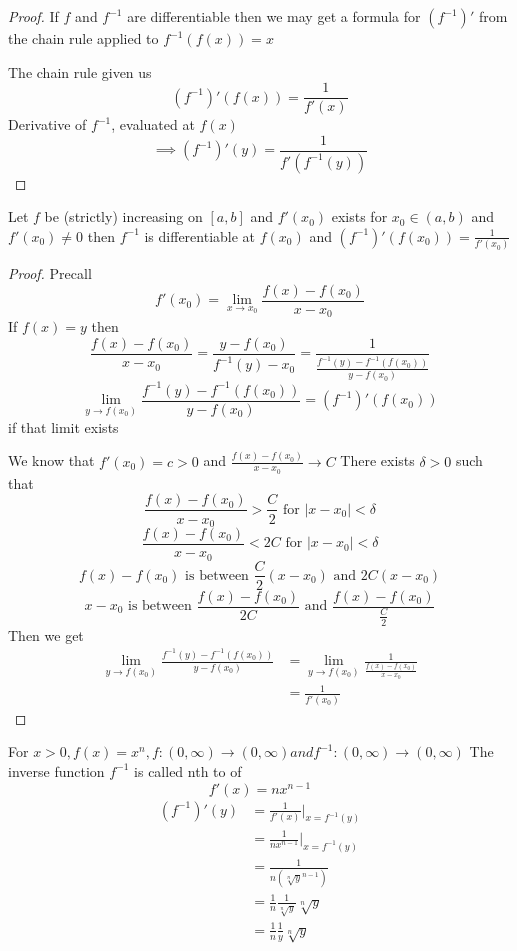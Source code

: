\begin{proof}
  If $f$ and $f^{-1}$ are differentiable then we may get a formula for $(f^{-1})'$ from the chain rule applied to $f^{-1}(f(x)) = x$

  The chain rule given us
  $$(f^{-1})'(f(x)) = \frac{1}{f'(x)}$$
  Derivative of $f^{-1}$, evaluated at $f(x)$
  $$\implies (f^{-1})'(y) = \frac{1}{f'(f^{-1}(y))}$$
\end{proof}

\begin{theorem*}
  Let $f$ be (strictly) increasing on $[a, b]$ and $f'(x_0)$ exists for $x_0 \in (a, b)$ and $f'(x_0) \neq 0$ then $f^{-1}$ is differentiable at $f(x_0)$
  and $(f^{-1})'(f(x_0)) = \frac{1}{f'(x_0)}$
\end{theorem*}

\begin{proof}
  Precall $$f'(x_0) = \lim\limits_{x \to x_0}\frac{f(x) - f(x_0)}{x-x_0}$$
  If $f(x) = y$ then $$\frac{f(x) - f(x_0)}{x-x_0} = \frac{y-f(x_0)}{f^{-1}(y) - x_0} = \frac{1}{\frac{f^{-1}(y) - f^{-1}(f(x_0))}{y-f(x_0)}}$$
  $$\lim\limits_{y \to f(x_0)}\frac{f^{-1}(y) - f^{-1}(f(x_0))}{y - f(x_0)} = (f^{-1})'(f(x_0))$$
  if that limit exists

  We know that $f'(x_0) = c > 0$ and $\frac{f(x) - f(x_0)}{x - x_0} \to C$
  There exists $\delta > 0$ such that 
  $$\frac{f(x) - f(x_0)}{x - x_0} > \frac{C}{2} \text{ for } |x - x_0| < \delta$$
  $$\frac{f(x) - f(x_0)}{x - x_0} < 2C \text{ for } |x - x_0| < \delta$$
  $$f(x) - f(x_0) \text{ is between } \frac{C}{2}(x - x_0) \text{ and } 2C(x-x_0)$$
  $$x - x_0 \text{ is between } \frac{f(x) - f(x_0)}{2C} \text{ and } \frac{f(x) - f(x_0)}{\frac{C}{2}}$$
  Then we get
  \begin{align*}
    \lim\limits_{y \to f(x_0)} \frac{f^{-1}(y) - f^{-1}(f(x_0))}{y - f(x_0)} &= \lim\limits_{y \to f(x_0)} \frac{1}{\frac{f(x) - f(x_0)}{x-x_0}}\\
    &= \frac{1}{f'(x_0)}
  \end{align*}
\end{proof}

\begin{example*}
  For $x > 0, f(x) = x^n, f:(0, \infty) \to (0, \infty) and f^{-1}: (0, \infty) \to (0, \infty)$
  The inverse function $f^{-1}$ is called nth to of
  $$f'(x) = nx^{n-1}$$
  \begin{align*}
  (f^{-1})'(y) &= \frac{1}{f'(x)} |_{x=f^{-1}(y)} \\
  &= \frac{1}{nx^{n-1}}|_{x = f^{-1}(y)} \\
  &= \frac{1}{n(\sqrt[n]{y}^{n-1})} \\
  &= \frac{1}{n}\frac{1}{\sqrt[n]{y}}\sqrt[n]{y} \\
  &= \frac{1}{n}\frac{1}{y}\sqrt[n]{y}
  \end{align*}
\end{example*}

